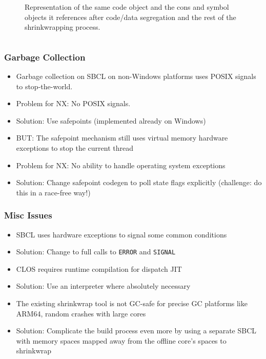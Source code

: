 \documentclass[14pt,t,aspectratio=169]{beamer}
\begin{document}
\begin{frame}
  \begin{figure}
    \begin{columns}
      \vspace{-1.7em}
      \phantom{123}
      
      Representation of the same code object and the cons and
      symbol objects it references after code/data segregation and the
      rest of the shrinkwrapping process.
    \end{columns}
  \end{figure}
\end{frame}

\begin{frame}
  \frametitle{Garbage Collection}
  \begin{itemize}
  \item Garbage collection on SBCL on non-Windows platforms uses POSIX
    signals to stop-the-world.
  \item \Rightarrow{} Problem for NX: No POSIX signals.
  \item Solution: Use safepoints (implemented already on Windows)
  \item BUT: The safepoint mechanism still uses virtual memory
    hardware exceptions to stop the current thread
  \item \Rightarrow{} Problem for NX: No ability to handle operating system
    exceptions
  \item Solution: Change safepoint codegen to poll state flags
    explicitly (challenge: do this in a race-free way!)
  \end{itemize}
\end{frame}

\begin{frame}
  \frametitle{Misc Issues}
  \begin{itemize}
  \item SBCL uses hardware exceptions to signal some common conditions
  \item \Rightarrow{} Solution: Change to full calls to \texttt{ERROR} and \texttt{SIGNAL}
  \item CLOS requires runtime compilation for dispatch JIT
  \item \Rightarrow{} Solution: Use an interpreter where absolutely necessary
  \item The existing shrinkwrap tool is not GC-safe for precise GC
    platforms like ARM64, random crashes with large cores
  \item  \Rightarrow{} Solution: Complicate the build process even more by using
    a separate SBCL with memory spaces mapped away from the offline
    core's spaces to shrinkwrap
  \end{itemize}
\end{frame}
\end{document}
